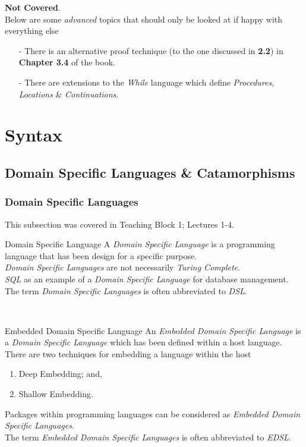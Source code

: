 \documentclass[11pt,a4paper]{article}
\begin{document}
\tableofcontents

\textbf{Not Covered}.\\
Below are some \textit{advanced} topics that should only be looked at if happy with everything else
\begin{itemize}
	\item[-]There is an alternative proof technique (to the one discussed in \textbf{2.2}) in \textbf{Chapter 3.4} of the book.
	\item[-]There are extensions to the \textit{While} language which define \textit{Procedures, Locations} \& \textit{Continuations}.
\end{itemize}

\newpage

\section{Syntax}

\subsection{Domain Specific Languages \& Catamorphisms}

\subsubsection{Domain Specific Languages}
This subsection was covered in Teaching Block 1; Lectures 1-4.\\

\begin{definition}{Domain Specific Language}
A \textit{Domain Specific Language} is a programming language that has been design for a specific purpose.\\
\textit{Domain Specific Languages} are not necessarily \textit{Turing Complete}.\\
\EG\textit{SQL} as an example of a \textit{Domain Specific Language} for database management.\\
\NB The term \textit{Domain Specific Languages} is often abbreviated to \textit{DSL}.
\end{definition}\\

\begin{definition}{Embedded Domain Specific Language}
An \textit{Embedded Domain Specific Language} is a \textit{Domain Specific Language} which has been defined within a host language.\\
There are two techniques for embedding a language within the host
\begin{enumerate}
	\item Deep Embedding; and,
	\item Shallow Embedding.
\end{enumerate}
\EG Packages within programming languages can be considered as \textit{Embedded Domain Specific Languages}.\\
\NB The term \textit{Embedded Domain Specific Languages} is often abbreviated to \textit{EDSL}.
\end{definition}\\
\end{document}
